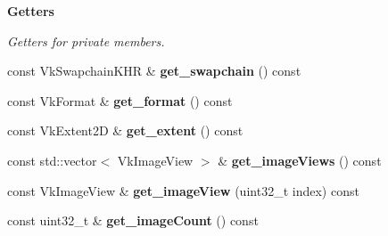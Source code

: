 \begin{Indent}\textbf{ Getters}\par
{\em Getters for private members. }\begin{DoxyCompactItemize}
\item 
\mbox{\label{classblaze_1_1Swapchain_a9a2fe335a790ad8581165bc353d26569}} 
const Vk\+Swapchain\+K\+HR \& {\bfseries get\+\_\+swapchain} () const
\item 
\mbox{\label{classblaze_1_1Swapchain_a103a3cebe7b75028eeb9c39c16038d86}} 
const Vk\+Format \& {\bfseries get\+\_\+format} () const
\item 
\mbox{\label{classblaze_1_1Swapchain_a69bca799467458dc5a4fbeea81903d9e}} 
const Vk\+Extent2D \& {\bfseries get\+\_\+extent} () const
\item 
\mbox{\label{classblaze_1_1Swapchain_a7945c6e9ec1469f757cde951574ba56a}} 
const std\+::vector$<$ Vk\+Image\+View $>$ \& {\bfseries get\+\_\+image\+Views} () const
\item 
\mbox{\label{classblaze_1_1Swapchain_ad8ec74238cba2e2b5c99700e816677d0}} 
const Vk\+Image\+View \& {\bfseries get\+\_\+image\+View} (uint32\+\_\+t index) const
\item 
\mbox{\label{classblaze_1_1Swapchain_a91a4f7baa440ae11d61fe81a59c1aa33}} 
const uint32\+\_\+t \& {\bfseries get\+\_\+image\+Count} () const
\end{DoxyCompactItemize}
\end{Indent}
